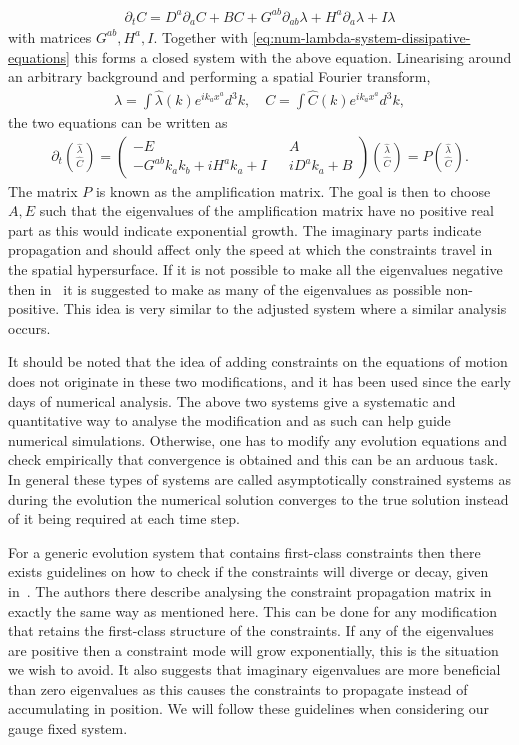 \documentclass[10pt]{report}
\theoremstyle{definition}
\begin{document}
\begin{align}
    \partial_t C = D^a \partial_a C + B C + G^{ab} \partial_{ab} \lambda + H^{a} \partial_a \lambda + I \lambda
\end{align}
with matrices $G^{ab}, H^a, I$. Together with \cref{eq:num-lambda-system-dissipative-equations} this forms a closed system with the above equation. Linearising around an arbitrary background and performing a spatial Fourier transform,
\begin{align}
    \lambda = \int \hat{\lambda}(k) e^{ik_a x^a} d^3k, \quad C = \int \hat{C}(k) e^{ik_a x^a} d^3 k,
\end{align}
the two equations can be written as 
\begin{align}
    \partial_t \binom{\hat{\lambda}}{\hat{C}} = \begin{pmatrix}
        -E && A \\ -G^{ab} k_a k_b + i H^a k_a + I && i D^a k_a + B
    \end{pmatrix} \binom{\hat{\lambda}}{\hat{C}} = P \binom{\hat{\lambda}}{\hat{C}}.
\end{align}
The matrix $P$ is known as the amplification matrix. The goal is then to choose $A,E$ such that the eigenvalues of the amplification matrix have no positive real part as this would indicate exponential growth. The imaginary parts indicate propagation and should affect only the speed at which the constraints travel in the spatial hypersurface. If it is not possible to make all the eigenvalues negative then in~\cite{Formulations_of_Shinka_2008} it is suggested to make as many of the eigenvalues as possible non-positive. This idea is very similar to the adjusted system where a similar analysis occurs.

It should be noted that the idea of adding constraints on the equations of motion does not originate in these two modifications, and it has been used since the early days of numerical analysis. The above two systems give a systematic and quantitative way to analyse the modification and as such can help guide numerical simulations. Otherwise, one has to modify any evolution equations and check empirically that convergence is obtained and this can be an arduous task. In general these types of systems are called asymptotically constrained systems as during the evolution the numerical solution converges to the true solution instead of it being required at each time step.

For a generic evolution system that contains first-class constraints then there exists guidelines on how to check if the constraints will diverge or decay, given in~\cite{Diagonalizabili_Yoneda_2002}. The authors there describe analysing the constraint propagation matrix in exactly the same way as mentioned here. This can be done for any modification that retains the first-class structure of the constraints. If any of the eigenvalues are positive then a constraint mode will grow exponentially, this is the situation we wish to avoid. It also suggests that imaginary eigenvalues are more beneficial than zero eigenvalues as this causes the constraints to propagate instead of accumulating in position. We will follow these guidelines when considering our gauge fixed system.
\end{document}
